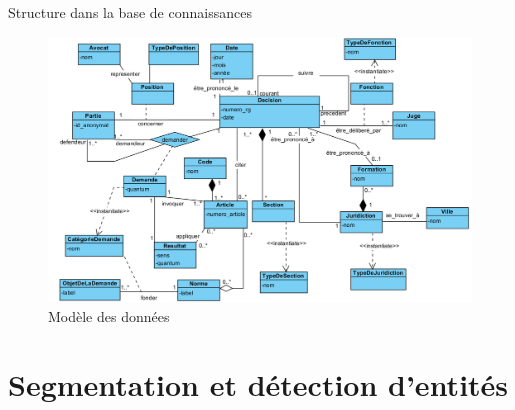 \documentclass[newPxFont,pagenumber]{beamer}
\begin{document}
\begin{frame}{Structure dans la base de connaissances}
\begin{figure}
\includegraphics[width=0.8\paperwidth]{class-diagram.png}
\caption{Modèle des données}
\end{figure}
\end{frame}


%
%
\section{Segmentation et détection d'entités}
\end{document}
